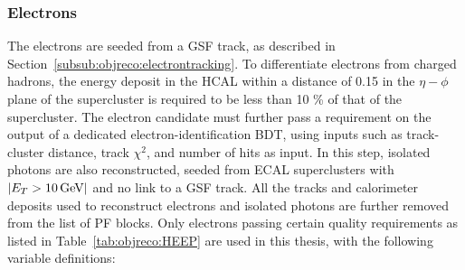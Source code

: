 \subsubsection{Electrons}
\label{sec:objreco:electrons}
The electrons are seeded from a GSF track, as described in Section~\ref{subsub:objreco:electrontracking}. To differentiate electrons from charged hadrons, the energy deposit in the HCAL within a distance of 0.15 in the $\eta-\phi$ plane of the supercluster is required to be less than 10 \% of that of the supercluster. The electron candidate must further pass a requirement on the output of a dedicated electron-identification BDT, using inputs such as track-cluster distance, track $\chi^2$, and number of hits as input.  In this step, isolated photons are also reconstructed, seeded from ECAL superclusters with $|E_T>10 \,\text{Ge\hspace{-.08em}V}|$ and no link to a GSF track.
All the tracks and calorimeter deposits used to reconstruct electrons and isolated photons are further removed from the list of PF blocks. \newline
Only electrons passing certain quality requirements as listed in Table~\ref{tab:objreco:HEEP} are used in this thesis, with the following variable definitions:
